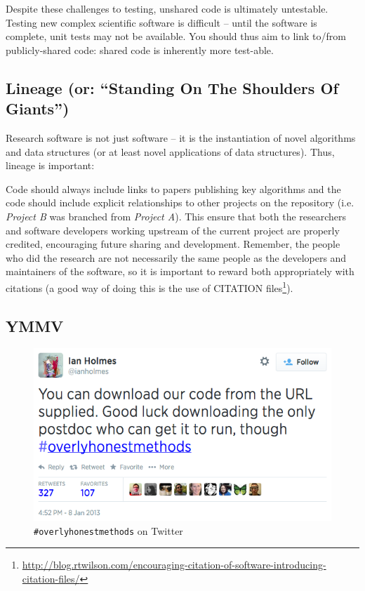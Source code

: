 \documentclass[10pt,conference,final]{IEEEtran}
\begin{document}
 Despite these
challenges to testing, unshared code is ultimately untestable.
Testing new complex scientific software is difficult -- until the
software is complete, unit tests may not be available. You should thus
aim to link to/from publicly-shared code: shared code is inherently more
test-able.

\subsection{Lineage (or: ``Standing On The Shoulders Of Giants'')} 

Research software is not just software -- it is the instantiation of
novel algorithms and data structures (or at least novel applications
of data structures). Thus, lineage is important:

 Code should always
include links to papers publishing key algorithms and the code should
include explicit relationships to other projects on the repository
(i.e. {\emph{Project B}} was branched from {\emph{Project A}}). This
ensure that both the researchers and software developers working
upstream of the current project are properly credited, encouraging
future sharing and development. Remember, the people who did the
research are not necessarily the same people as the developers and
maintainers of the software, so it is important to reward both
appropriately with citations (a good way of doing this is the use of
CITATION
files\footnote{\url{http://blog.rtwilson.com/encouraging-citation-of-software-introducing-citation-files/}}).

\subsection{YMMV}

\begin{figure}[!ht]
\centering
\includegraphics[width=0.9\columnwidth]{overlyhonesttweet.png}
\caption{{\texttt{\#overlyhonestmethods}} on Twitter}
\label{fig:overlyhonestmethod} 
\end{figure}
\end{document}

